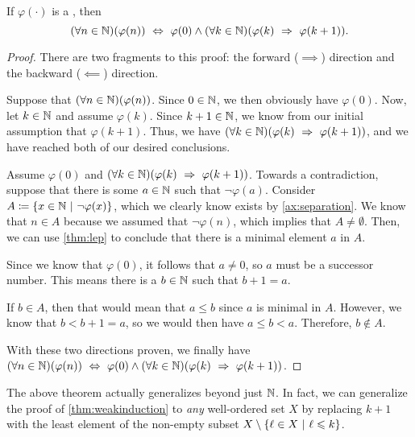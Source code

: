 \begin{theorem}\label{thm:weakinduction}
    If $\varphi(\cdot)$ is a {\wff}, then
    \[
        \pn*{\forall n \in \N}\pn*{\varphi(n)}
        \iff \varphi(0) \meet \pn*{\forall k \in \N}\pn*{\varphi(k) \implies \varphi(k + 1)}.
    \]
\end{theorem}
\begin{proof}
    There are two fragments to this proof:
    the forward ($\implies$) direction and the backward ($\impliedby$) direction.
    \begin{case}
        Suppose that $\pn*{\forall n \in \N}\pn*{\varphi(n)}$.
        Since $0 \in \mathbb{N}$, we then obviously have $\varphi(0)$.
        Now, let $k \in \mathbb{N}$ and assume $\varphi(k)$.
        Since $k + 1 \in \mathbb{N}$, we know from our initial assumption that $\varphi(k + 1)$.
        Thus, we have $\pn*{\forall k \in \N}\pn*{\varphi(k) \implies \varphi(k + 1)}$,
        and we have reached both of our desired conclusions.
    \end{case}
    \begin{case}
        Assume $\varphi(0)$ and $\pn*{\forall k \in \N}\pn*{\varphi(k) \implies \varphi(k + 1)}$.
        Towards a contradiction,
        suppose that there is some $a \in \mathbb{N}$ such that $\neg \varphi(a)$.
        Consider $A \defn \set*{x \in \N \suchthat \neg \varphi(x)}$,
        which we clearly know exists by \autoref{ax:separation}.
        We know that $n \in A$ because we assumed that $\neg \varphi(n)$,
        which implies that $A \neq \emptyset$.
        Then, we can use \autoref{thm:lep} to conclude that there is a minimal element $a$ in $A$.

        Since we know that $\varphi(0)$, it follows that $a \neq 0$, so $a$ must be a successor number.
        This means there is a $b \in \mathbb{N}$ such that $b + 1 = a$.

        If $b \in A$, then that would mean that $a \leq b$ since $a$ is minimal in $A$.
        However, we know that $b < b + 1 = a$, so we would then have $a \leq b < a$. \contradiction
        Therefore, $b \not \in A$.
    \end{case}
    With these two directions proven, we finally have
    $\pn*{\forall n \in \N}\pn*{\varphi(n)}
    \iff \varphi(0) \meet \pn*{\forall k \in \N}\pn*{\varphi(k) \implies \varphi(k + 1)}$.
\end{proof}

\begin{note}
The above theorem actually generalizes beyond just $\mathbb{N}$.
In fact, we can generalize the proof of \autoref{thm:weakinduction}
to \emph{any} well-ordered set $X$ by replacing $k + 1$
with the least element of the non-empty subset $X \setminus \set*{\ell \in X \suchthat \ell \leq k}$.
\end{note}

